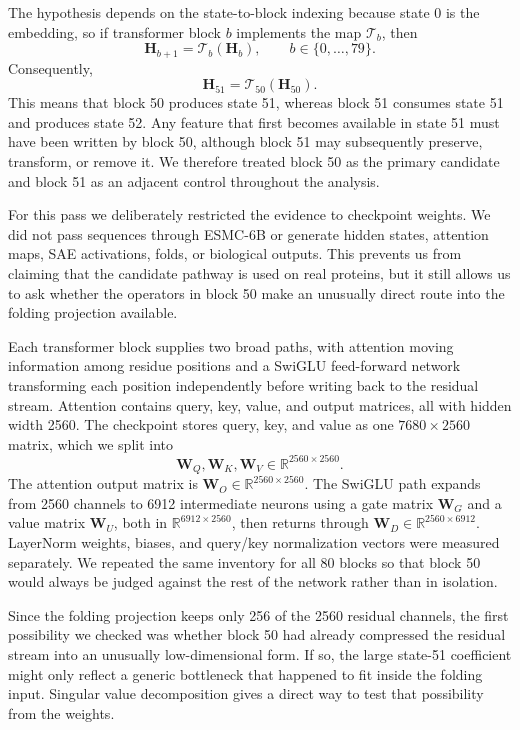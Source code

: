 \documentclass[11pt]{article}
\newcommand{\ESMC}{ESMC-6B\xspace}
\newcommand{\R}{\mathbb{R}}
\newcommand{\mat}[1]{\mathbf{#1}}
\begin{document}
The hypothesis depends on the state-to-block indexing because state 0 is the embedding, so if transformer block $b$ implements the map $\mathcal{T}_b$, then
\begin{equation}
\mat{H}_{b+1}=\mathcal{T}_b(\mat{H}_b),
\qquad b\in\{0,\ldots,79\}.
\label{eq:indexing}
\end{equation}
Consequently,
\[
\mat{H}_{51}=\mathcal{T}_{50}(\mat{H}_{50}).
\]
This means that block 50 produces state 51, whereas block 51 consumes state 51 and produces state 52. Any feature that first becomes available in state 51 must have been written by block 50, although block 51 may subsequently preserve, transform, or remove it. We therefore treated block 50 as the primary candidate and block 51 as an adjacent control throughout the analysis.

For this pass we deliberately restricted the evidence to checkpoint weights. We did not pass sequences through \ESMC or generate hidden states, attention maps, SAE activations, folds, or biological outputs. This prevents us from claiming that the candidate pathway is used on real proteins, but it still allows us to ask whether the operators in block 50 make an unusually direct route into the folding projection available.

Each transformer block supplies two broad paths, with attention moving information among residue positions and a SwiGLU feed-forward network transforming each position independently before writing back to the residual stream. Attention contains query, key, value, and output matrices, all with hidden width 2560. The checkpoint stores query, key, and value as one $7680\times2560$ matrix, which we split into
\[
\mat{W}_Q,\mat{W}_K,\mat{W}_V\in\R^{2560\times2560}.
\]
The attention output matrix is $\mat{W}_O\in\R^{2560\times2560}$. The SwiGLU path expands from 2560 channels to 6912 intermediate neurons using a gate matrix $\mat{W}_G$ and a value matrix $\mat{W}_U$, both in $\R^{6912\times2560}$, then returns through $\mat{W}_D\in\R^{2560\times6912}$. LayerNorm weights, biases, and query/key normalization vectors were measured separately. We repeated the same inventory for all 80 blocks so that block 50 would always be judged against the rest of the network rather than in isolation.

Since the folding projection keeps only 256 of the 2560 residual channels, the first possibility we checked was whether block 50 had already compressed the residual stream into an unusually low-dimensional form. If so, the large state-51 coefficient might only reflect a generic bottleneck that happened to fit inside the folding input. Singular value decomposition gives a direct way to test that possibility from the weights.
\end{document}
